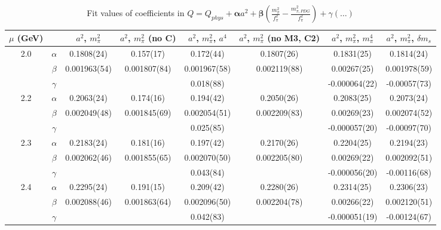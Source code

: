 \documentclass[12pt]{extarticle}
\begin{document}
\begin{table}[h!]
\begin{center}
\begin{tabular}{|c c|c|c|c|c|c|c|}
\hline
$\mu$ (GeV) &  & $a^2$, $m_\pi^2$& $a^2$, $m_\pi^2$ (no C)& $a^2$, $m_\pi^2$, $a^4$& $a^2$, $m_\pi^2$ (no M3, C2)& $a^2$, $m_\pi^2$, $m_\pi^4$& $a^2$, $m_\pi^2$, $\delta m_s$\\
\hline
\multirow{3}{0.5in}{2.0} & $\alpha$ & 0.1808(24)& 0.157(17)& 0.172(44)& 0.1807(26)& 0.1831(25)& 0.1814(24)\\
 & $\beta$ & 0.001963(54)& 0.001807(84)& 0.001967(58)& 0.002119(88)& 0.00267(25)& 0.001978(59)\\
 & $\gamma$ &  &  & 0.018(88)&  & -0.000064(22)& -0.00057(73)\\
\hline
\multirow{3}{0.5in}{2.2} & $\alpha$ & 0.2063(24)& 0.174(16)& 0.194(42)& 0.2050(26)& 0.2083(25)& 0.2073(24)\\
 & $\beta$ & 0.002049(48)& 0.001845(69)& 0.002054(51)& 0.002209(83)& 0.00269(23)& 0.002074(52)\\
 & $\gamma$ &  &  & 0.025(85)&  & -0.000057(20)& -0.00097(70)\\
\hline
\multirow{3}{0.5in}{2.3} & $\alpha$ & 0.2183(24)& 0.181(16)& 0.197(42)& 0.2170(26)& 0.2204(25)& 0.2194(23)\\
 & $\beta$ & 0.002062(46)& 0.001855(65)& 0.002070(50)& 0.002205(80)& 0.00269(22)& 0.002092(51)\\
 & $\gamma$ &  &  & 0.043(84)&  & -0.000056(20)& -0.00116(68)\\
\hline
\multirow{3}{0.5in}{2.4} & $\alpha$ & 0.2295(24)& 0.191(15)& 0.209(42)& 0.2280(26)& 0.2314(25)& 0.2306(23)\\
 & $\beta$ & 0.002088(46)& 0.001863(64)& 0.002096(50)& 0.002204(78)& 0.00266(22)& 0.002120(51)\\
 & $\gamma$ &  &  & 0.042(83)&  & -0.000051(19)& -0.00124(67)\\
\hline
\end{tabular}
\caption{Fit values of coefficients in $Q = Q_{phys} + \mathbf{\alpha} a^2 + \mathbf{\beta}\left(\frac{m_\pi^2}{f_\pi^2}-\frac{m_{\pi,PDG}^2}{f_\pi^2}\right) + \gamma(\ldots)$}
\end{center}
\end{table}





\end{document}
